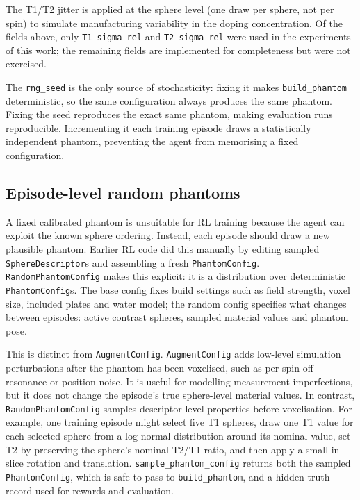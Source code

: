 The T1/T2 jitter is applied at the sphere level (one draw per sphere,
not per spin) to simulate manufacturing variability in the doping
concentration. Of the fields above, only \texttt{T1\_sigma\_rel} and
\texttt{T2\_sigma\_rel} were used in the experiments of this work; the
remaining fields are implemented for completeness but were not
exercised.

The \texttt{rng\_seed} is the only source of stochasticity: fixing it
makes \texttt{build\_phantom} deterministic, so the same configuration
always produces the same phantom. Fixing the seed reproduces the exact
same phantom, making evaluation runs reproducible. Incrementing it each
training episode draws a statistically independent phantom, preventing
the agent from memorising a fixed configuration.

\hypertarget{episode-level-random-phantoms}{%
\subsection{Episode-level random phantoms}\label{episode-level-random-phantoms}}

A fixed calibrated phantom is unsuitable for RL training because the
agent can exploit the known sphere ordering. Instead, each episode should
draw a new plausible phantom. Earlier RL code did this manually by editing
sampled \texttt{SphereDescriptor}s and assembling a fresh
\texttt{PhantomConfig}. \texttt{RandomPhantomConfig} makes this explicit:
it is a distribution over deterministic \texttt{PhantomConfig}s. The base
config fixes build settings such as field strength, voxel size, included
plates and water model; the random config specifies what changes between
episodes: active contrast spheres, sampled material values and phantom
pose.

This is distinct from \texttt{AugmentConfig}. \texttt{AugmentConfig}
adds low-level simulation perturbations after the phantom has been
voxelised, such as per-spin off-resonance or position noise. It is useful
for modelling measurement imperfections, but it does not change the
episode's true sphere-level material values. In contrast,
\texttt{RandomPhantomConfig} samples descriptor-level properties before
voxelisation. For example, one training episode might select five T1
spheres, draw one T1 value for each selected sphere from a log-normal
distribution around its nominal value, set T2 by preserving the sphere's
nominal T2/T1 ratio, and then apply a small in-slice rotation and
translation. \texttt{sample\_phantom\_config} returns both the sampled
\texttt{PhantomConfig}, which is safe to pass to \texttt{build\_phantom},
and a hidden truth record used for rewards and evaluation.

